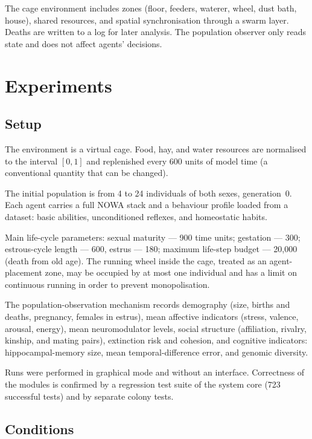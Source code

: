 \documentclass[11pt,a4paper]{article}
\begin{document}
The cage environment includes zones (floor, feeders, waterer, wheel, dust bath, house), shared resources, and spatial synchronisation through a swarm layer. Deaths are written to a log for later analysis. The population observer only reads state and does not affect agents' decisions.

\section{Experiments}

\subsection{Setup}

The environment is a virtual cage. Food, hay, and water resources are normalised to the interval \([0, 1]\) and replenished every 600 units of model time (a conventional quantity that can be changed).

The initial population is from 4 to 24 individuals of both sexes, generation~0. Each agent carries a full NOWA stack and a behaviour profile loaded from a dataset: basic abilities, unconditioned reflexes, and homeostatic habits.

Main life-cycle parameters: sexual maturity --- 900 time units; gestation --- 300; estrous-cycle length --- 600, estrus --- 180; maximum life-step budget --- 20{,}000 (death from old age). The running wheel inside the cage, treated as an agent-placement zone, may be occupied by at most one individual and has a limit on continuous running in order to prevent monopolisation.

The population-observation mechanism records demography (size, births and deaths, pregnancy, females in estrus), mean affective indicators (stress, valence, arousal, energy), mean neuromodulator levels, social structure (affiliation, rivalry, kinship, and mating pairs), extinction risk and cohesion, and cognitive indicators: hippocampal-memory size, mean temporal-difference error, and genomic diversity.

Runs were performed in graphical mode and without an interface. Correctness of the modules is confirmed by a regression test suite of the system core (723 successful tests) and by separate colony tests.

\subsection{Conditions}
\end{document}
